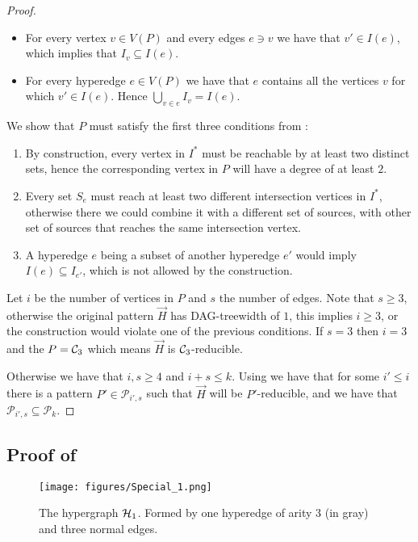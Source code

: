 \documentclass[a4paper,UKenglish,cleveref, autoref, numberwithinsect, thm-restate]{lipics-v2021}
\newcommand{\reducible}[1]{${#1}$-reducible}
\newcommand{\cycle}[1]{\cC_{#1}}
\newcommand{\hyperone}{\cH_1}
\newcommand{\dagtreewidth}{DAG-treewidth}
\newcommand{\cC}{{\cal C}}
\newcommand{\cH}{{\cal H}}
\begin{document}
\begin{proof}
		\begin{itemize}
			\item For every vertex $v \in V(P)$ and every edges $e \ni v$ we have that $v' \in I(e)$, which implies that $I_v \subseteq I(e)$.
			\item For every hyperedge $e \in V(P)$ we have that $e$ contains all the vertices $v$ for which $v' \in I(e)$. Hence $\bigcup_{v\in e}I_v = I(e)$.
		\end{itemize}
		
		We show that $P$ must satisfy the first three conditions from :
		\begin{enumerate}
			\item By construction, every vertex in $I^*$ must be reachable by at least two distinct sets, hence the corresponding vertex in $P$ will have a degree of at least $2$.
			\item Every set $S_e$ must reach at least two different intersection vertices in $I^*$, otherwise there we could combine it with a different set of sources, with other set of sources that reaches the same intersection vertex.
			\item A hyperedge $e$ being a subset of another hyperedge $e'$ would imply $I(e) \subseteq I_{e'}$, which is not allowed by the construction.
		\end{enumerate}
		
		Let $i$ be the number of vertices in $P$ and $s$ the number of edges. Note that $s \geq 3$, otherwise the original pattern $\vec{H}$ has \dagtreewidth{} of $1$, this implies $i \geq 3$, or the construction would violate one of the previous conditions. If $s=3$ then $i=3$ and the $P = \cycle{3}$ which means $\vec{H}$ is \reducible{\cycle{3}}. 
		
		Otherwise we have that $i,s \geq 4$ and $i+s \leq k$. Using  we have that for some $i' \leq i$ there is a pattern $P'\in \mathcal{P}_{i',s}$ such that $\vec{H}$ will be \reducible{P'}, and we have that  $\mathcal{P}_{i',s} \subseteq \mathcal{P}_k$.
	\end{proof}
	
	\subsection{Proof of }
	
	\begin{figure}
		\centering
		\texttt{[image: figures/Special\_1.png]}\caption{The hypergraph $\hyperone$. Formed by one hyperedge of arity $3$ (in gray) and three normal edges.}
		\label{fig:hyperone}
	\end{figure}
	
\end{document}
